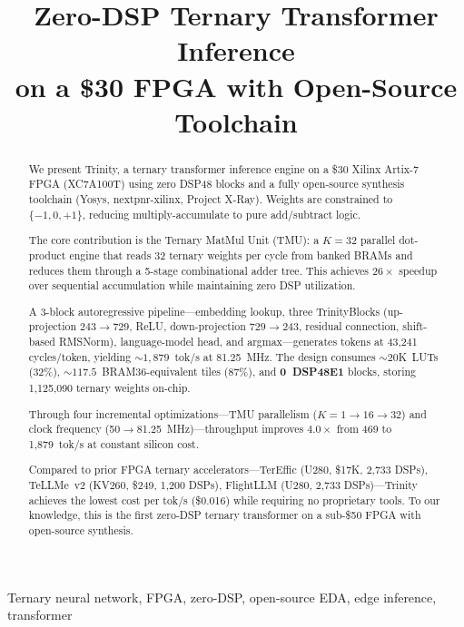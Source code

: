 \documentclass[conference]{IEEEtran}
\begin{document}
\title{Zero-DSP Ternary Transformer Inference\\on a \$30 FPGA with Open-Source Toolchain}

\author{
}

\maketitle

\begin{abstract}
We present Trinity, a ternary transformer inference engine on a \$30 Xilinx
Artix-7 FPGA (XC7A100T) using zero DSP48 blocks and a fully open-source
synthesis toolchain (Yosys, nextpnr-xilinx, Project X-Ray).  Weights are
constrained to $\{-1, 0, +1\}$, reducing multiply-accumulate to pure
add/subtract logic.

The core contribution is the Ternary MatMul Unit (TMU): a $K\!=\!32$ parallel
dot-product engine that reads 32 ternary weights per cycle from banked BRAMs
and reduces them through a 5-stage combinational adder tree.  This achieves
$26\times$ speedup over sequential accumulation while maintaining zero DSP
utilization.

A 3-block autoregressive pipeline---embedding lookup, three TrinityBlocks
(up-projection $243\!\to\!729$, ReLU, down-projection $729\!\to\!243$,
residual connection, shift-based RMSNorm), language-model head, and
argmax---generates tokens at 43,241 cycles/token, yielding
${\sim}1{,}879$~tok/s at 81.25~MHz.  The design consumes ${\sim}20$K~LUTs
(32\%), ${\sim}117.5$~BRAM36-equivalent tiles (87\%), and \textbf{0~DSP48E1}
blocks, storing 1,125,090 ternary weights on-chip.

Through four incremental optimizations---TMU parallelism ($K\!=\!1 \to 16
\to 32$) and clock frequency (50$\to$81.25~MHz)---throughput improves
$4.0\times$ from 469 to 1,879~tok/s at constant silicon cost.

Compared to prior FPGA ternary accelerators---TerEffic (U280, \$17K, 2,733
DSPs), TeLLMe~v2 (KV260, \$249, 1,200 DSPs), FlightLLM (U280, 2,733
DSPs)---Trinity achieves the lowest cost per tok/s (\$0.016) while requiring
no proprietary tools.  To our knowledge, this is the first zero-DSP ternary
transformer on a sub-\$50 FPGA with open-source synthesis.
\end{abstract}

\begin{IEEEkeywords}
Ternary neural network, FPGA, zero-DSP, open-source EDA, edge inference, transformer
\end{IEEEkeywords}
\end{document}
